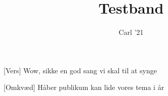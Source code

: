 \documentclass[a4paper,11pt]{article}
\title{Testband}
\author{Carl '21}
\begin{document}
\maketitle

\begin{song}
[Vers] Wow, sikke en god sang vi skal til at synge

[Omkvæd] Håber publikum kan lide vores tema i år
\end{song}
\end{document}
